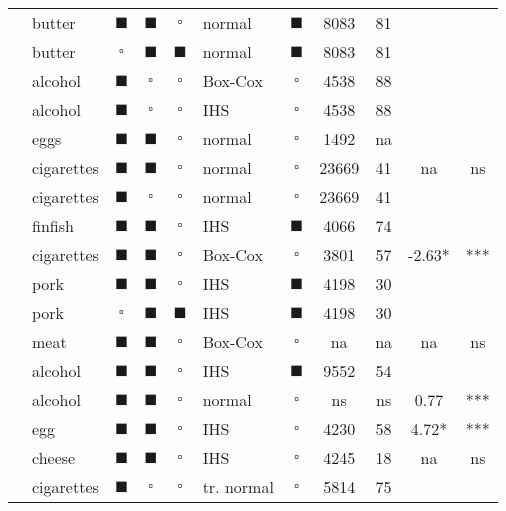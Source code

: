 \begin{landscape}
\begin{center}
\begin{footnotesize}
\begin{longtable}{llccclccccc}
  \cite{YEN:SU:95} & butter & $\blacksquare$ & $\blacksquare$ & $\square$ & normal & $\blacksquare$ & 8083 & 81 &  &  \\ 
  \cite{YEN:SU:95} & butter & $\square$ & $\blacksquare$ & $\blacksquare$ & normal & $\blacksquare$ & 8083 & 81 &  &  \\ 
  \cite{YEN:95} & alcohol & $\blacksquare$ & $\square$ & $\square$ & Box-Cox & $\square$ & 4538 & 88 &  &  \\ 
  \cite{YEN:95} & alcohol & $\blacksquare$ & $\square$ & $\square$ & IHS & $\square$ & 4538 & 88 &  &  \\ 
  \cite{WANG:JENS:YEN:96} & eggs & $\blacksquare$ & $\blacksquare$ & $\square$ & normal & $\square$ & 1492 & na &  &  \\ 
  \cite{GARC:LABE:96} & cigarettes & $\blacksquare$ & $\blacksquare$ & $\square$ & normal & $\square$ & 23669 & 41 & na & ns \\ 
  \cite{GARC:LABE:96} & cigarettes & $\blacksquare$ & $\square$ & $\square$ & normal & $\square$ & 23669 & 41 &  &  \\ 
  \cite{YEN:HUAN:96} & finfish & $\blacksquare$ & $\blacksquare$ & $\square$ & IHS & $\blacksquare$ & 4066 & 74 &  &  \\ 
  \cite{YEN:JONE:96} & cigarettes & $\blacksquare$ & $\blacksquare$ & $\square$ & Box-Cox & $\square$ & 3801 & 57 & -2.63* & *** \\ 
  \cite{SU:YEN:96} & pork & $\blacksquare$ & $\blacksquare$ & $\square$ & IHS & $\blacksquare$ & 4198 & 30 &  &  \\ 
  \cite{SU:YEN:96} & pork & $\square$ & $\blacksquare$ & $\blacksquare$ & IHS & $\blacksquare$ & 4198 & 30 &  &  \\ 
  \cite{BURT:DORS:YOUN:96} & meat & $\blacksquare$ & $\blacksquare$ & $\square$ & Box-Cox & $\square$ & na & na & na & ns \\ 
  \cite{YEN:JENS:96} & alcohol & $\blacksquare$ & $\blacksquare$ & $\square$ & IHS & $\blacksquare$ & 9552 & 54 &  &  \\ 
  \cite{WANG:GAO:WAIL:96} & alcohol & $\blacksquare$ & $\blacksquare$ & $\square$ & normal & $\square$ & ns & ns & 0.77 & *** \\ 
  \cite{YEN:JENS:WANG:96} & egg & $\blacksquare$ & $\blacksquare$ & $\square$ & IHS & $\square$ & 4230 & 58 & 4.72* & *** \\ 
  \cite{YEN:JONE:97} & cheese & $\blacksquare$ & $\blacksquare$ & $\square$ & IHS & $\square$ & 4245 & 18 & na & ns \\ 
  \cite{YEN:99} & cigarettes & $\blacksquare$ & $\square$ & $\square$ & tr. normal & $\square$ & 5814 & 75 &  &  \\ 

\end{longtable}
\end{footnotesize}
\end{center}
\end{landscape}
